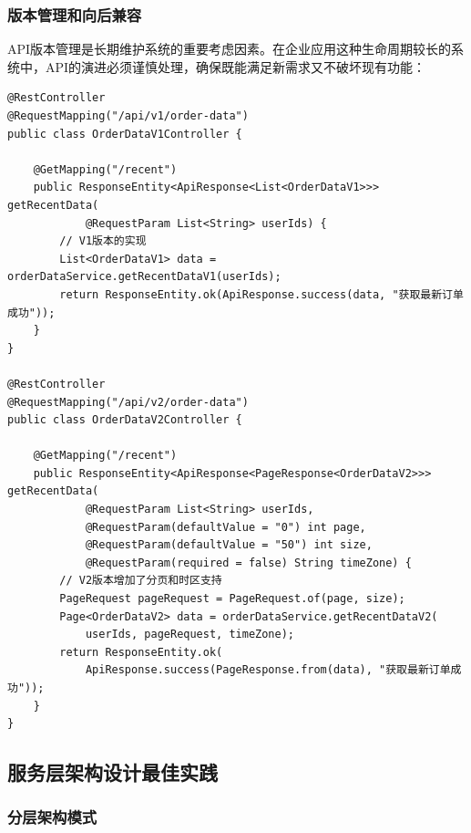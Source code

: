 \hypertarget{ux7248ux672cux7ba1ux7406ux548cux5411ux540eux517cux5bb9}{%
\subsubsection{版本管理和向后兼容}\label{ux7248ux672cux7ba1ux7406ux548cux5411ux540eux517cux5bb9}}

API版本管理是长期维护系统的重要考虑因素。在企业应用这种生命周期较长的系统中，API的演进必须谨慎处理，确保既能满足新需求又不破坏现有功能：

\begin{lstlisting}[style=java]
@RestController
@RequestMapping("/api/v1/order-data")
public class OrderDataV1Controller {
    
    @GetMapping("/recent")
    public ResponseEntity<ApiResponse<List<OrderDataV1>>> getRecentData(
            @RequestParam List<String> userIds) {
        // V1版本的实现
        List<OrderDataV1> data = orderDataService.getRecentDataV1(userIds);
        return ResponseEntity.ok(ApiResponse.success(data, "获取最新订单成功"));
    }
}

@RestController  
@RequestMapping("/api/v2/order-data")
public class OrderDataV2Controller {
    
    @GetMapping("/recent")
    public ResponseEntity<ApiResponse<PageResponse<OrderDataV2>>> getRecentData(
            @RequestParam List<String> userIds,
            @RequestParam(defaultValue = "0") int page,
            @RequestParam(defaultValue = "50") int size,
            @RequestParam(required = false) String timeZone) {
        // V2版本增加了分页和时区支持
        PageRequest pageRequest = PageRequest.of(page, size);
        Page<OrderDataV2> data = orderDataService.getRecentDataV2(
            userIds, pageRequest, timeZone);
        return ResponseEntity.ok(
            ApiResponse.success(PageResponse.from(data), "获取最新订单成功"));
    }
}
\end{lstlisting}

\hypertarget{ux670dux52a1ux5c42ux67b6ux6784ux8bbeux8ba1ux6700ux4f73ux5b9eux8df5}{%
\subsection{服务层架构设计最佳实践}\label{ux670dux52a1ux5c42ux67b6ux6784ux8bbeux8ba1ux6700ux4f73ux5b9eux8df5}}

\hypertarget{ux5206ux5c42ux67b6ux6784ux6a21ux5f0f}{%
\subsubsection{分层架构模式}\label{ux5206ux5c42ux67b6ux6784ux6a21ux5f0f}}


